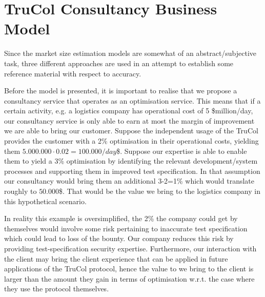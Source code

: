\section{TruCol Consultancy Business Model}\label{sec:trucol_consultancy_business_model}
Since the market size estimation models are somewhat of an abstract/subjective task, three different approaches are used in an attempt to establish some reference material with respect to accuracy.


Before the model is presented, it is important to realise that we propose a consultancy service that operates as an optimisation service. This means that if a certain activity, e.g. a logistics company has operational cost of 5 \$million/day, our consultancy service is only able to earn at most the margin of improvement we are able to bring our customer. Suppose the independent usage of the TruCol provides the customer with a 2\% optimisation in their operational costs, yielding them $5.000.000\cdot 0.02=100.000/day$\$. Suppose our expertise is able to enable them to yield a 3\% optimisation by identifying the relevant development/system processes and supporting them in improved test specification. In that assumption our consultancy would bring them an additional 3-2=1\% which would translate roughly to $50.000$\$. That would be the value we bring to the logistics company in this hypothetical scenario.

In reality this example is oversimplified, the 2\% the company could get by themselves would involve some risk pertaining to inaccurate test specification which could lead to loss of the bounty. Our company reduces this risk by providing test-specification security expertise. Furthermore, our interaction with the client may bring the client experience that can be applied in future applications of the TruCol protocol, hence the value to we bring to the client is larger than the amount they gain in terms of optimisation w.r.t. the case where they use the protocol themselves.